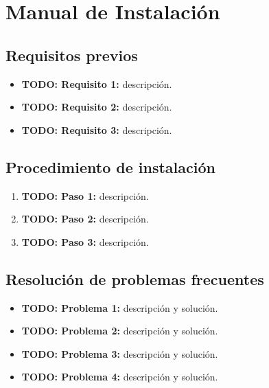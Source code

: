 \chapter{Manual de Instalación}


\section{Requisitos previos}


\begin{itemize}
    \item \textbf{TODO: Requisito 1:} descripción.
    \item \textbf{TODO: Requisito 2:} descripción.
    \item \textbf{TODO: Requisito 3:} descripción.
\end{itemize}

\section{Procedimiento de instalación}


\begin{enumerate}
    \item \textbf{TODO: Paso 1:} descripción.
    \item \textbf{TODO: Paso 2:} descripción.
    \item \textbf{TODO: Paso 3:} descripción.
\end{enumerate}

\section{Resolución de problemas frecuentes}


\begin{itemize}
    \item \textbf{TODO: Problema 1:} descripción y solución.
    \item \textbf{TODO: Problema 2:} descripción y solución.
    \item \textbf{TODO: Problema 3:} descripción y solución.
    \item \textbf{TODO: Problema 4:} descripción y solución.
\end{itemize}

